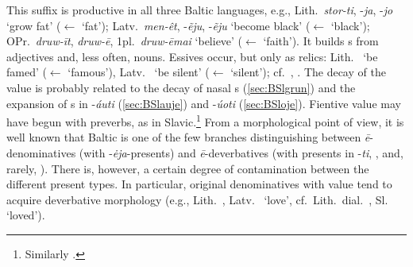 \documentclass[output=paper,colorlinks,citecolor=brown]{langscibook}
\begin{document}
This suffix is productive in all three Baltic languages, e.g., Lith.\ \textit{stor-ti}, \mbox{-\textit{ja},} \mbox{-\textit{jo}} ‘grow fat’ ($\leftarrow$  ‘fat’); Latv.\ \textit{me\ltilded n-êt}, -\textit{ẽju}, -\textit{ẽju} ‘become black’ ($\leftarrow$ \mbox{} ‘black’); OPr.\ \textit{druw-īt}, \textit{druw-ē},  1pl.\ \textit{druw-ēmai} ‘believe’ ($\leftarrow$  ‘faith’). It builds s from adjectives  and, less often, nouns. Essives occur, but only as relics: Lith.\  ‘be famed’ ($\leftarrow$  ‘famous’), Latv.\  ‘be silent’ ($\leftarrow$  ‘silent’); cf.\ \citet{Pakerys2006}, \citet[109--115]{Ostrowski2006}. The decay of the  value is probably related to the decay of nasal s   (\ref{sec:BSlgrun}) and the expansion of s in -\textit{áuti} (\ref{sec:BSlauje}) and -\textit{úoti} (\ref{sec:BSloje}). Fientive value may have begun with preverbs, as in Slavic.\footnote{Similarly \citet[115]{Ostrowski2006}.} From a morphological point of view, it is well known that Baltic is one of the few branches distinguishing between \textit{ē}-denominatives (with \mbox{-\textit{\.eja}}-presents) and \textit{ē}-deverbatives (with presents in -\textit{ti}, ,  and, rarely, \mbox{}). There is, however, a certain degree of contamination between the different present types. In particular, original denominatives with  value tend to acquire deverbative morphology (e.g., Lith.\ , Latv.\  ‘love’, cf.\ Lith.\ dial.\ , Sl.\  ‘loved’).
\end{document}
